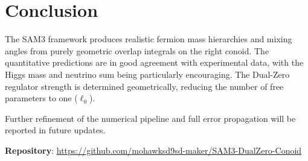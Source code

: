 \documentclass[11pt,a4paper]{article}
\begin{document}
\section{Conclusion}
The SAM3 framework produces realistic fermion mass hierarchies and mixing angles from purely geometric overlap integrals on the right conoid. The quantitative predictions are in good agreement with experimental data, with the Higgs mass and neutrino sum being particularly encouraging. The Dual-Zero regulator strength is determined geometrically, reducing the number of free parameters to one (\(\ell_0\)).

Further refinement of the numerical pipeline and full error propagation will be reported in future updates.

\vspace{1em}
\textbf{Repository}: \url{https://github.com/mohawksd9sd-maker/SAM3-DualZero-Conoid}
\end{document}
